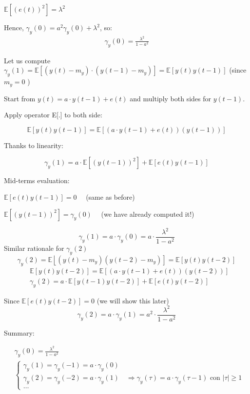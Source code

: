 $\mathbb{E}\left[(e(t))^{2}\right]=\lambda^{2}$

Hence, $\gamma_{y}(0)=a^{2} \gamma_{y}(0)+\lambda^{2}$, so:
\begin{align*}
	\gamma_{y}(0)=\frac{\lambda^{2}}{1-a^{2}}
\end{align*} 

Let us compute $\gamma_{y}(1)=\mathbb{E}\left[\left(y(t)-m_{y}\right) \cdot\left(y(t-1)-m_{y}\right)\right]=\mathbb{E}[y(t) y(t-1)]$ (since $m_{y}=0$ )

Start from $y(t)=a \cdot y(t-1)+e(t)$ and multiply both sides for $y(t-1)$.

Apply operator E[.] to both side:

$$\mathbb{E}[y(t) y(t-1)]=\mathbb{E}[(a \cdot y(t-1)+e(t))(y(t-1))]$$

Thanks to linearity:

$$\gamma_{y}(1)=a \cdot \mathbb{E}\left[(y(t-1))^{2}\right]+\mathbb{E}[e(t) y(t-1)]$$

Mid-terms evaluation:

$\mathbb{E}[e(t) y(t-1)]=0 \quad$ (same as before)

$\mathbb{E}\left[(y(t-1))^{2}\right]=\gamma_{y}(0) \quad$ (we have already computed it!)

$$
\gamma_{y}(1)=a \cdot \gamma_{y}(0)=a \cdot \frac{\lambda^{2}}{1-a^{2}}
$$
Similar rationale for $\gamma_{y}(2)$
$$
\gamma_{y}(2)=\mathbb{E}\left\lfloor\left(y(t)-m_{y}\right)\left(y(t-2)-m_{y}\right)\right]=\mathbb{E}[y(t) y(t-2)]
$$
\begin{align*}
	&\mathbb{E}[y(t) y(t-2)]=\mathbb{E}[(a \cdot y(t-1)+e(t))(y(t-2))] \\
	&\gamma_{y}(2)=a \cdot \mathbb{E}[y(t-1) y(t-2)]+\mathbb{E}[e(t) y(t-2)]
\end{align*}

Since $\mathbb{E}[e(t) y(t-2)]=0$ (we will show this later)
$$
\gamma_{y}(2)=a \cdot \gamma_{y}(1)=a^{2} \cdot \frac{\lambda^{2}}{1-a^{2}}
$$

Summary:

\begin{align*}
	&\gamma_{y}(0)=\frac{\lambda^{2}}{1-a^{2}} \\
	&\left\{\begin{array}{l}
		\gamma_{y}(1)=\gamma_{y}(-1)=a \cdot \gamma_{y}(0) \\
		\gamma_{y}(2)=\gamma_{y}(-2)=a \cdot \gamma_{y}(1) \quad \Rightarrow \gamma_{y}(\tau)=a \cdot \gamma_{y}(\tau-1) \text { con }|\tau| \geq 1 \\
		\ldots
	\end{array}\right.
\end{align*}

